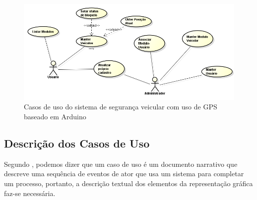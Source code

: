 \begin{figure}[!htb]
\centering
\includegraphics[width=\textwidth]{figures/2_uc.png}
\caption{Casos de uso do sistema de seguran\c{c}a veicular com uso de GPS baseado em Arduino}
\label{fig:casosuso}
\end{figure}

\subsection{Descrição dos Casos de Uso}

Segundo \textcite{jacobson:2005}, podemos dizer que um caso de uso é um documento narrativo que descreve uma sequência de eventos de ator que usa um sistema para completar um processo, portanto, a descrição textual dos elementos da representação gráfica faz-se necessária.

